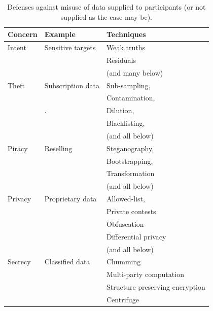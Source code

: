 \begin{table}
\begin{tabular}{|l|l|l|}
\hline 
  Concern  & Example              &  Techniques    \\ \hline
  Intent & Sensitive targets & Weak truths \\ 
         &            & Residuals \\ 
         &            & (and many below) \\ \hline
  Theft    & Subscription data & Sub-sampling, \\ 
                  &                 & Contamination,              \\
                  & .               & Dilution, \\
                  &                 & Blacklisting,           \\
                             &                 & (and all below)     \\
  \hline
 Piracy   & Reselling   &  Steganography, \\
                   &                      & Bootstrapping, \\
                   &                      & Transformation \\
                             &                 & (and all below)     \\
         \hline
  Privacy  & Proprietary data   &  Allowed-list,   \\  
         &                               & Private contests  \\
         &                               & Obfuscation  \\
         &                               & Differential privacy \\
                             &                 & (and all below)     \\
         \hline
  Secrecy & Classified data      & Chumming \\
           &                     & Multi-party computation   \\
           &                     & Structure preserving encryption  \\
           &                     & Centrifuge \\
   \hline
\end{tabular}
\caption{Defenses against misuse of data supplied to participants (or not supplied as the case may be).}
\label{tab:datause}
\end{table}



